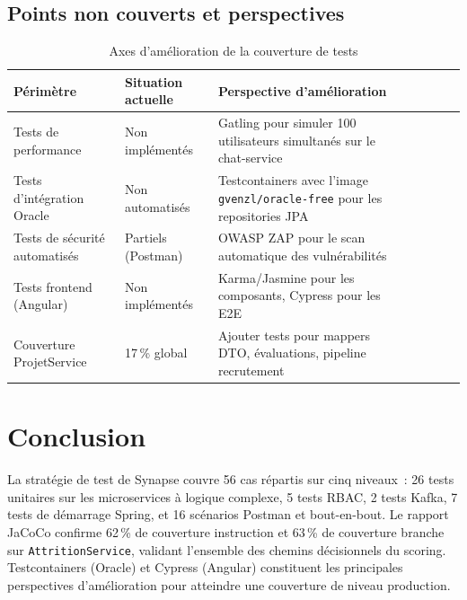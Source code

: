 \subsection{Points non couverts et perspectives}

\begin{table}[H]
\centering
\caption{Axes d'amélioration de la couverture de tests}
\label{tab:tests_amelioration}
\begin{tabularx}{\textwidth}{VlVLVLV}
\hline
\textbf{Périmètre} & \textbf{Situation actuelle} & \textbf{Perspective d'amélioration} \\
\hline
Tests de performance & Non implémentés & Gatling pour simuler 100 utilisateurs simultanés sur le chat-service \\
\hline
Tests d'intégration Oracle & Non automatisés & Testcontainers avec l'image \texttt{gvenzl/oracle-free} pour les repositories JPA \\
\hline
Tests de sécurité automatisés & Partiels (Postman) & OWASP ZAP pour le scan automatique des vulnérabilités \\
\hline
Tests frontend (Angular) & Non implémentés & Karma/Jasmine pour les composants, Cypress pour les E2E \\
\hline
Couverture ProjetService & 17\,\% global & Ajouter tests pour mappers DTO, évaluations, pipeline recrutement \\
\hline
\end{tabularx}
\end{table}

\section{Conclusion}

La stratégie de test de Synapse couvre 56 cas répartis sur cinq niveaux~: 26 tests
unitaires sur les microservices à logique complexe, 5 tests RBAC, 2 tests Kafka,
7 tests de démarrage Spring, et 16 scénarios Postman et bout-en-bout. Le rapport
JaCoCo confirme 62\,\% de couverture instruction et 63\,\% de couverture branche
sur \texttt{AttritionService}, validant l'ensemble des chemins décisionnels du
scoring. Testcontainers (Oracle) et Cypress (Angular) constituent les principales
perspectives d'amélioration pour atteindre une couverture de niveau production.
